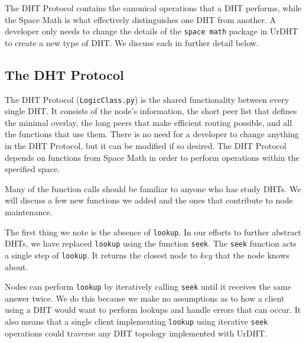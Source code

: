 The DHT Protocol contains the canonical operations that a DHT performs, while the Space Math is what effectively distinguishes one DHT from another.
A developer only needs to change the details of the \texttt{space math} package in UrDHT to create a new type of DHT.
We discuss each in further detail below.

\subsection{The DHT Protocol }
\label{sec:protocol}

The DHT Protocol (\texttt{LogicClass.py}) \cite{urdht} is the shared functionality between every single DHT.
It consists of the node's information, the short peer list that defines the minimal overlay, the long peers that make efficient routing possible, and all the functions that use them.
There is no need for a developer to change anything in the DHT Protocol, but it can be modified if so desired.
The DHT Protocol depends on functions from Space Math in order to perform operations within the specified space.

Many of the function calls should be familiar to anyone who has study DHTs.
We will discuss a few new functions we added and the ones that contribute to node maintenance.



The first thing we note is the absence of \texttt{lookup}.
In our efforts to further abstract DHTs, we have replaced \texttt{lookup} using the function \texttt{seek}.
The \texttt{seek} function acts a single step of \texttt{lookup}.
It returns the closest node to $ key $ that the node knows about.

Nodes can perform \texttt{lookup} by iteratively calling \texttt{seek} until it receives the same answer twice.
We do this because we make no assumptions as to how a client using a DHT would want to perform lookups and handle errors that can occur.
It also means that a single client implementing \texttt{lookup} using iterative \texttt{seek} operations could traverse any DHT topology implemented with UrDHT.

%
%
%


